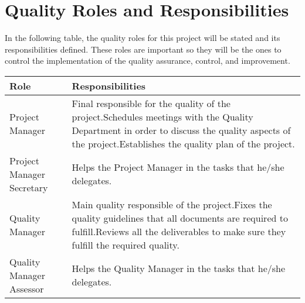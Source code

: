 \section{Quality Roles and Responsibilities}
In the following table, the quality roles for this project will be stated and its responsibilities defined. These roles are important so they will be the ones to control the implementation of the quality assurance, control, and improvement.

\begin{longtable}[H]{>{\raggedright\arraybackslash}p{5cm} p{9cm}}
	
	\toprule[2pt]
	
	\textbf{Role} &  \textbf{Responsibilities}\\
	
	\midrule [1.5pt]
	\endhead
	
	Project Manager & Final responsible for the quality of the project.\vspace{0.3cm}\newline Schedules meetings with the Quality Department in order to discuss the quality aspects of the project.\vspace{0.3cm}\newline Establishes the quality plan of the project.\vspace{0.2cm} \\
	
	\midrule
		
	Project Manager Secretary & Helps the Project Manager in the tasks that he/she delegates.\vspace{0.2cm} \\
	
	\midrule
	
	Quality Manager & Main quality responsible of the project.\vspace{0.3cm}\newline Fixes the quality guidelines that all documents are required to fulfill.\vspace{0.3cm}\newline Reviews all the deliverables to make sure they fulfill the required quality.\vspace{0.2cm} \\

	\midrule
	
	Quality Manager Assessor & Helps the Quality Manager in the tasks that he/she delegates.\vspace{0.2cm} \\
	

\end{longtable}
